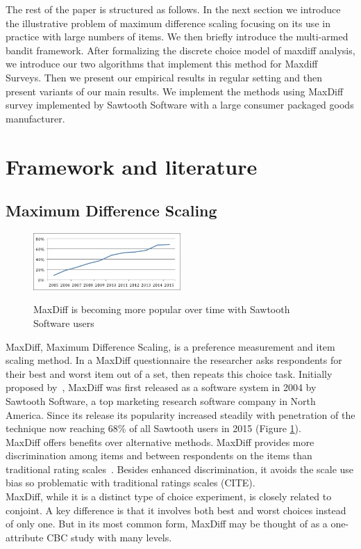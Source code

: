 \documentclass[nonblindrev]{informs3}
\begin{document}
The rest of the paper is structured as follows. In the next section we introduce the illustrative problem of maximum difference scaling focusing on its use in practice with large numbers of items. We then briefly introduce the multi-armed bandit framework. After formalizing the discrete choice model of maxdiff analysis, we introduce our two algorithms that implement this method for Maxdiff Surveys. Then we present our empirical results in regular setting and then present variants of our main results. We implement the methods using MaxDiff survey implemented by Sawtooth Software with a large consumer packaged goods manufacturer. \\


\section{Framework and literature}
\subsection{Maximum Difference Scaling}
\begin{figure}
\caption{MaxDiff is becoming more popular over time with Sawtooth Software users}
\includegraphics[width=0.5\textwidth]{plots/maxdiffpop}
\label{fig:pop}
\end{figure}
MaxDiff, Maximum Difference Scaling, is a preference measurement and item scaling method.  In a MaxDiff questionnaire the researcher asks respondents for their best and worst item out of a set, then repeats this choice task. Initially proposed by~\cite{louviere1991best}, MaxDiff was first released as a software system in 2004 by Sawtooth Software, a top marketing research software company in North America. Since its release its popularity increased steadily with penetration of the technique now reaching 68\% of all Sawtooth users in 2015 (Figure \ref{fig:pop}). \\
MaxDiff offers benefits over alternative methods. MaxDiff provides more discrimination among items and between respondents on the items than traditional rating scales~\cite{cohen2004s}. Besides enhanced discrimination, it avoids the scale use bias so problematic with traditional ratings scales (CITE).\\
MaxDiff, while it is a distinct type of choice experiment, is closely related to conjoint. A key difference is that it involves both best and worst choices instead of only one. But in its most common form, MaxDiff may be thought of as a one-attribute CBC study with many levels.  \\
\end{document}
